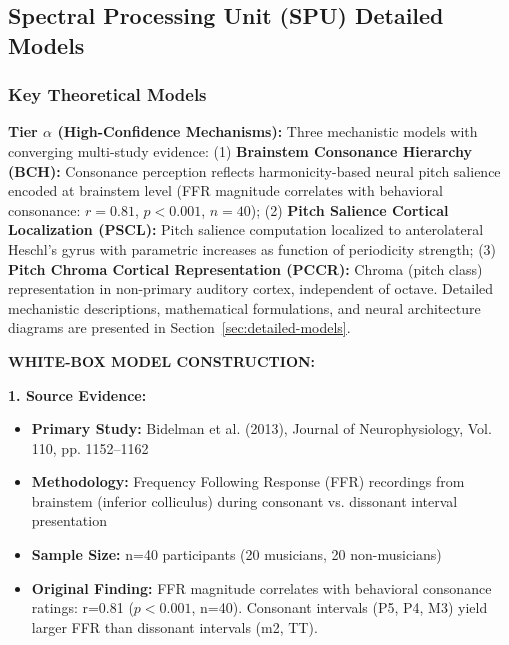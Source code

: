 \documentclass[9pt,onecolumn]{article}
\newcommand{\SPU}{\textcolor{spucolor}{\textbf{SPU}}}
\begin{document}
\subsection{Spectral Processing Unit (\SPU{}) Detailed Models}

\subsubsection{Key Theoretical Models}

\textbf{Tier $\alpha$ (High-Confidence Mechanisms):} Three mechanistic models with converging multi-study evidence: (1) \textbf{Brainstem Consonance Hierarchy (BCH):} Consonance perception reflects harmonicity-based neural pitch salience encoded at brainstem level (FFR magnitude correlates with behavioral consonance: $r=0.81$, $p<0.001$, $n=40$); (2) \textbf{Pitch Salience Cortical Localization (PSCL):} Pitch salience computation localized to anterolateral Heschl's gyrus with parametric increases as function of periodicity strength; (3) \textbf{Pitch Chroma Cortical Representation (PCCR):} Chroma (pitch class) representation in non-primary auditory cortex, independent of octave. Detailed mechanistic descriptions, mathematical formulations, and neural architecture diagrams are presented in Section~\ref{sec:detailed-models}.

\textbf{WHITE-BOX MODEL CONSTRUCTION:}

\textbf{1. Source Evidence:}
\begin{itemize}[leftmargin=*, topsep=1pt, itemsep=1pt]
    \item \textbf{Primary Study:} Bidelman et al. (2013), Journal of Neurophysiology, Vol. 110, pp. 1152--1162
    \item \textbf{Methodology:} Frequency Following Response (FFR) recordings from brainstem (inferior colliculus) during consonant vs. dissonant interval presentation
    \item \textbf{Sample Size:} n=40 participants (20 musicians, 20 non-musicians)
    \item \textbf{Original Finding:} FFR magnitude correlates with behavioral consonance ratings: r=0.81 ($p<0.001$, n=40). Consonant intervals (P5, P4, M3) yield larger FFR than dissonant intervals (m2, TT).
\end{itemize}
\end{document}
